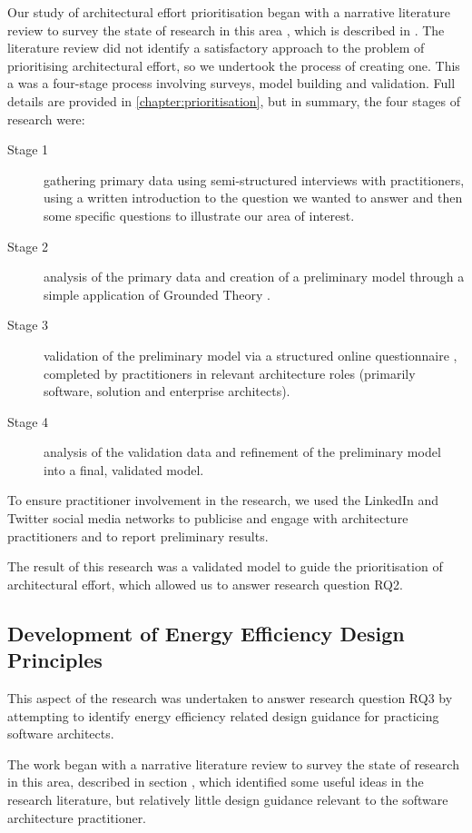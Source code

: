 Our study of architectural effort prioritisation began with a narrative literature review to survey the state of research in this area \cite{baumeister1997-narrativereviews}, which is described in .  The literature review did not identify a satisfactory approach to the problem of prioritising architectural effort, so we undertook the process of creating one.  This a was a four-stage process involving surveys, model building and validation.  Full details are provided in \cref{chapter:prioritisation}, but in summary, the four stages of research were:
\nopagebreak
\begin{description}
	\item [Stage 1] gathering primary data using semi-structured interviews with practitioners, using a written introduction to the question we wanted to answer and then some specific questions to illustrate our area of interest. 
	\item [Stage 2] analysis of the primary data and creation of a preliminary model through a simple application of Grounded Theory \cite{charmaz2006-groundedtheory}.
	\item [Stage 3] validation of the preliminary model via a structured online questionnaire \cite{gillham2000-questionnaire}, completed by practitioners in relevant architecture roles (primarily software, solution and enterprise architects).
	\item [Stage 4] analysis of the validation data and refinement of the preliminary model into a final, validated model.
\end{description}

To ensure practitioner involvement in the research, we used the LinkedIn and Twitter social media networks to publicise and engage with architecture practitioners and to report preliminary results.

The result of this research was a validated model to guide the prioritisation of architectural effort, which allowed us to answer research question RQ2.

\subsection{Development of Energy Efficiency Design Principles}

This aspect of the research was undertaken to answer research question RQ3 by attempting to identify energy efficiency related design guidance for practicing software architects.

The work began with a narrative literature review to survey the state of research in this area, described in section , which identified some useful ideas in the research literature, but relatively little design guidance relevant to the software architecture practitioner.

